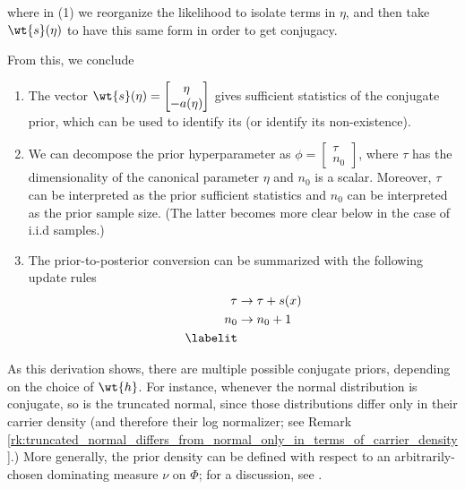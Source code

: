 where in (1) we reorganize the likelihood to isolate terms in $\eta$, and then take $\wt{\sufficientStatsFunction}(\eta)$ to have this same form in order to get conjugacy.  

From this, we conclude
\begin{enumerate} 
\item The vector $\wt{\sufficientStatsFunction}(\eta) = \begin{bmatrix} 
\eta \\
-\logNormalizerFunction(\eta)
\end{bmatrix}$ gives sufficient statistics of the conjugate prior, which can be used to identify its (or identify its non-existence).
\item We can decompose the prior hyperparameter as $\phi = \begin{bmatrix} 
\tau \\
n_0
\end{bmatrix}$,   
where $\tau$ has the dimensionality of the canonical parameter $\eta$ and $n_0$ is a scalar.  Moreover, $\tau$ can be interpreted as the prior sufficient statistics and $n_0$ can be interpreted as the prior sample size.  (The latter becomes more clear below in the case of i.i.d samples.)	
\item  The prior-to-posterior conversion can be summarized with the following update rules
\begin{align*}
\tau & \to \tau + \sufficientStatsFunction(x) \\
n_0 & \to  n_0 + 1 \\
\labelit \label{eqn:general_formalism_prior_to_posterior_conversion_after_single_observation}
\end{align*}
\end{enumerate}

\begin{remark}
As this derivation shows, there are multiple possible conjugate priors, depending on the choice of $\wt{\carrierDensity}$.   For instance, whenever the normal distribution is conjugate, so is the truncated normal, since those distributions differ only in their carrier density (and therefore their log normalizer; see Remark \ref{rk:truncated_normal_differs_from_normal_only_in_terms_of_carrier_density}.)  More generally, the prior density can be defined with respect to an arbitrarily-chosen dominating measure $\nu$ on $\Phi$; for a discussion, see  \href{https://stats.stackexchange.com/questions/176668/can-anyone-explain-conjugate-priors-in-simplest-possible-terms}{}.
\label{rk:conjugate_prior_can_have_any_desired_carrier_density}
\end{remark}


